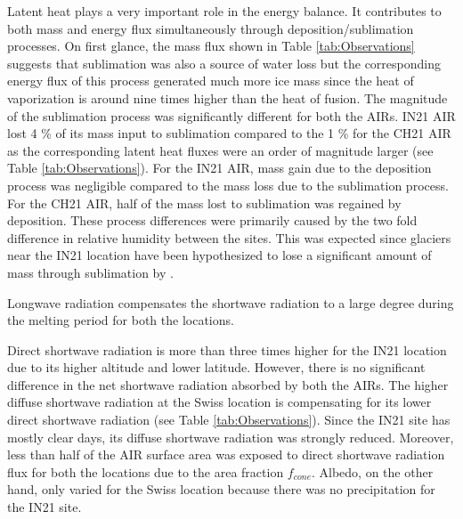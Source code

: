 \documentclass[utf8]{frontiersSCNS} %
\begin{document}
Latent heat plays a very important role in the energy balance. It contributes to both mass and energy flux
simultaneously through deposition/sublimation processes. On first glance, the mass flux shown in Table
\ref{tab:Observations} suggests that sublimation was also a source of water loss but the corresponding energy flux
of this process generated much more ice mass since the heat of vaporization is around nine times higher than the
heat of fusion. The magnitude of the sublimation process was significantly different for both the AIRs. IN21 AIR
lost 4 \% of its mass input to sublimation compared to the 1 \% for the CH21 AIR as the corresponding latent heat
fluxes were an order of magnitude larger (see Table \ref{tab:Observations}). For the IN21 AIR, mass gain due to the
deposition process was negligible compared to the mass loss due to the sublimation process. For the CH21 AIR, half
of the mass lost to sublimation was regained by deposition.  These process differences were primarily caused by the
two fold difference in relative humidity between the sites. This was expected since glaciers near the IN21 location
have been hypothesized to lose a significant amount of mass through sublimation by \cite{azam_2018}.

Longwave radiation compensates the shortwave radiation to a large degree during the melting period for both the
locations.

Direct shortwave radiation is more than three times higher for the IN21 location due to its higher altitude and lower latitude. However,
there is no significant difference in the net shortwave radiation absorbed by both the AIRs. The
higher diffuse shortwave radiation at the Swiss location is compensating for its lower direct shortwave radiation (see
Table \ref{tab:Observations}).  Since the IN21 site has mostly clear days, its diffuse shortwave radiation
was strongly reduced. Moreover, less than half of the AIR surface area was exposed to direct shortwave radiation flux for
both the locations due to the area fraction $f_{cone}$.   Albedo, on the other hand, only varied for the Swiss
location because there was no precipitation for the IN21 site.
\end{document}

